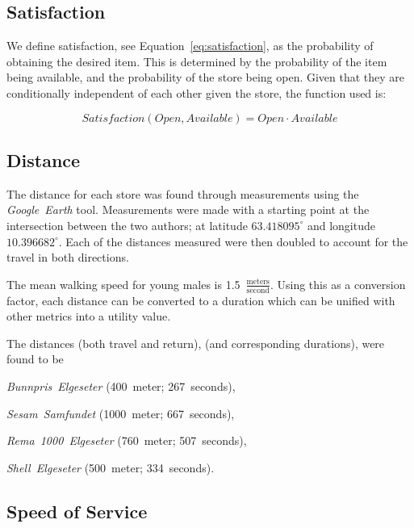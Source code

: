 \subsection{Satisfaction}

We define satisfaction, see Equation~\ref{eq:satisfaction}, as the probability of obtaining the desired item. This is determined by the probability of the item being available, and the probability of the store being open. Given that they are conditionally independent of each other given the store, the function used is:

\begin{equation}
\mathit{Satisfaction}(\mathit{Open}, \mathit{Available}) = \mathit{Open} \cdot \mathit{Available}
\label{eq:satisfaction}
\end{equation}

\subsection{Distance}

The distance for each store was found through measurements using the \textit{Google~Earth} tool. Measurements were made with a starting point at the intersection between the two authors; at latitude $63.418095^\circ$ and longitude $10.396682^\circ$. Each of the distances measured were then doubled to account for the travel in both directions.

The mean walking speed for young males is 1.5~$\frac{\text{meters}}{\text{second}}$\cite{carey2005establishing}. Using this as a conversion factor, each distance can be converted to a duration which can be unified with other metrics into a utility value.

The distances (both travel and return), (and corresponding durations), were found to be
\begin{enumerate*}
\item \textit{Bunnpris~Elgeseter} (400~meter; 267~seconds),
\item \textit{Sesam~Samfundet} (1000~meter; 667~seconds),
\item \textit{Rema~1000~Elgeseter} (760~meter; 507~seconds),
\item \textit{Shell~Elgeseter} (500~meter; 334~seconds).
\end{enumerate*}

\subsection{Speed of Service}

